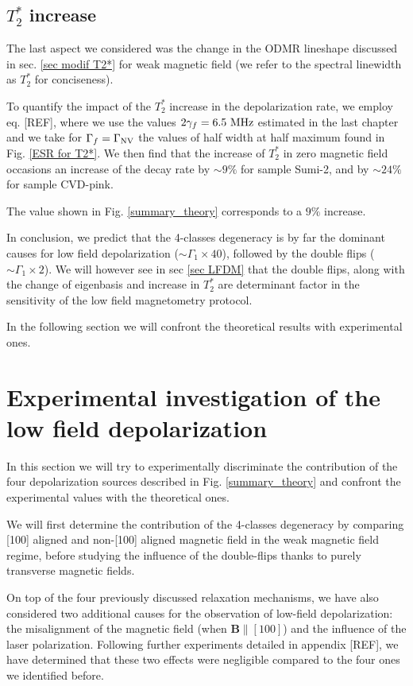 \documentclass[a4paper, 11pt]{book}
\begin{document}
\subsection{$T_2^*$ increase}

The last aspect we considered was the change in the ODMR lineshape discussed in sec. \ref{sec modif T2*} for weak magnetic field (we refer to the spectral linewidth as $T_2^*$ for conciseness).

To quantify the impact of the $T_2^*$ increase in the depolarization rate, we employ eq. [REF], where we use the values $2\gamma_f = 6.5\ \rm MHz$ estimated in the last chapter and we take for $\Gamma_f=\Gamma_{\rm NV}$ the values of half width at half maximum found in Fig. \ref{ESR for T2*}. We then find that the increase of $T_2^*$ in zero magnetic field occasions an increase of the decay rate by $\sim 9 \%$ for sample Sumi-2, and by $\sim 24 \%$ for sample CVD-pink. 

The value shown in Fig. \ref{summary_theory} corresponds to a $9 \%$ increase.

\bigskip

In conclusion, we predict that the 4-classes degeneracy is by far the dominant causes for low field depolarization ($\sim \Gamma_1 \times 40$), followed by the double flips ($\sim \Gamma_1 \times 2$). We will however see in sec \ref{sec LFDM} that the double flips, along with the change of eigenbasis and increase in $T_2^*$ are determinant factor in the sensitivity of the low field magnetometry protocol.

In the following section we will confront the theoretical results with experimental ones.

\section{Experimental investigation of the low field depolarization}
\label{sec 4.3}
In this section we will try to experimentally discriminate the contribution of the four depolarization sources described in Fig. \ref{summary_theory} and confront the experimental values with the theoretical ones. 

We will first determine the contribution of the 4-classes degeneracy by comparing [100] aligned and non-[100] aligned magnetic field in the weak magnetic field regime, before studying the influence of the double-flips thanks to purely transverse magnetic fields.

On top of the four previously discussed relaxation mechanisms, we have also considered two additional causes for the observation of low-field depolarization: the misalignment of the magnetic field (when $\mathbf{B}\parallel [100]$) and the influence of the laser polarization. Following further experiments detailed in appendix [REF], we have determined that these two effects were negligible compared to the four ones we identified before.
\end{document}
